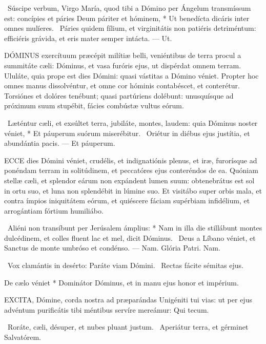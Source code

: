 \R\ Súscipe verbum, Virgo María, quod tibi a Dómino per Ángelum transmíssum est: concípies et páries Deum páriter et hóminem, * Ut benedícta dicáris inter omnes mulíeres. \V\ Páries quidem fílium, et virginitátis non patiéris detriméntum: efficiéris grávida, et eris mater semper intácta. --- Ut.


\lettrine[lines=2]{D}{ÓMINUS} exercítuum præcépit milítiæ belli, veniéntibus de terra procul a summitáte cæli: Dóminus, et vasa furóris ejus, ut dispérdat omnem terram. Ululáte, quia prope est dies Dómini: quasi vástitas a Dómino véniet. Propter hoc omnes manus dissolvéntur, et omne cor hóminis contabéscet, et conterétur. Torsiónes et dolóres tenébunt; quasi partúriens dolébunt: unusquísque ad próximum suum stupébit, fácies combústæ vultus eórum.

\R\ Læténtur cæli, et exsúltet terra, jubiláte, montes, laudem: quia Dóminus noster véniet, * Et páuperum suórum miserébitur. \V\ Oriétur in diébus ejus justítia, et abundántia pacis. --- Et páuperum.


\lettrine[lines=2]{E}{CCE} dies Dómini véniet, crudélis, et indignatiónis plenus, et iræ, furorísque ad ponéndam terram in solitúdinem, et peccatóres ejus conteréndos de ea. Quóniam stellæ cæli, et splendor eárum non expándent lumen suum: obtenebrátus est sol in ortu suo, et luna non splendébit in lúmine suo. Et visitábo super orbis mala, et contra ímpios iniquitátem eórum, et quiéscere fáciam supérbiam infidélium, et arrogántiam fórtium humiliábo.

\R\ Aliéni non transíbunt per Jerúsalem ámplius: * Nam in illa die stillábunt montes dulcédinem, et colles fluent lac et mel, dicit Dóminus. \V\ Deus a Líbano véniet, et Sanctus de monte umbróso et condénso. --- Nam. Glória Patri. Nam.

\V\ Vox clamántis in desérto: Paráte viam Dómini. \R\ Rectas fácite sémitas ejus.

 De cælo véniet * Dominátor Dóminus, et in manu ejus honor et impérium.


\lettrine[lines=2]{E}{XCITA}, Dómine, corda nostra ad præparándas Unigéniti tui vias: ut per ejus advéntum purificátis tibi méntibus servíre mereámur: Qui tecum.

\V\ Roráte, cæli, désuper, et nubes pluant justum. \R\ Aperiátur terra, et gérminet Salvatórem.

